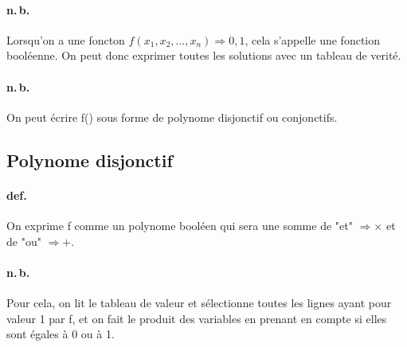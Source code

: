 \documentclass{report}
\begin{document}
  \paragraph{n.\,b.} Lorsqu'on a une foncton $f(x_{1}, x_{2}, ..., x_{n}) \Rightarrow {0, 1}$, cela s'appelle une fonction booléenne. On peut donc exprimer toutes les solutions avec un tableau de verité.

  \paragraph{n.\,b.} On peut écrire f() sous forme de polynome disjonctif ou conjonctifs.

  \subsection{Polynome disjonctif}

    \paragraph{def.} On exprime f comme un polynome booléen qui sera une somme de "et" $\Rightarrow \times$ et de "ou" $\Rightarrow +$.

    \paragraph{n.\,b.} Pour cela, on lit le tableau de valeur et sélectionne toutes les lignes ayant pour valeur 1 par f, et on fait le produit des variables en prenant en compte si elles sont égales à 0 ou à 1.

\end{document}

